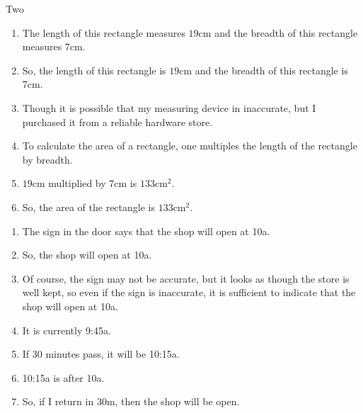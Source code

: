 \begin{note}
  Two 
\end{note}

\begin{note}
  \begin{illustration}
    \label{ill:rectangle:basic}
    \mbox{}
    \vspace{-\baselineskip}
    \begin{enumerate}
    \item The length of this rectangle measures \(19\text{cm}\) and the breadth of this rectangle measures \(7\text{cm}\).
    \item So, the length of this rectangle is \(19\text{cm}\) and the breadth of this rectangle is \(7\text{cm}\).
    \item\label{ill:rectangle:basic:reasoning} Though it is possible that my measuring device in inaccurate, but I purchased it from a reliable hardware store.
    \item To calculate the area of a rectangle, one multiples the length of the rectangle by breadth.
    \item\label{ill:rectangle:basic:reasoning} \(19\text{cm}\) multiplied by \(7\text{cm}\) is \(133\text{cm}^{2}\).
    \item So, the area of the rectangle is \(133\text{cm}^{2}\).
    \end{enumerate}
    \vspace{-\baselineskip}
  \end{illustration}
\end{note}

\begin{note}
  \begin{illustration}
    \label{ill:waiting-for-shop}
    \mbox{}
    \vspace{-\baselineskip}
    \begin{enumerate}
    \item The sign in the door says that the shop will open at 10a.
    \item So, the shop will open at 10a.
    \item\label{ill:waiting-for-shop:reasoning} Of course, the sign may not be accurate, but it looks as though the store is well kept, so even if the sign is inaccurate, it is sufficient to indicate that the shop will open at 10a.
    \item\label{ill:waiting-for-shop:current-time} It is currently 9:45a.
    \item If 30 minutes pass, it will be 10:15a.
    \item 10:15a is after 10a.
    \item\label{ill:waiting-for-shop:return} So, if I return in 30m, then the shop will be open.
    \end{enumerate}
    \vspace{-\baselineskip}
  \end{illustration}
\end{note}


